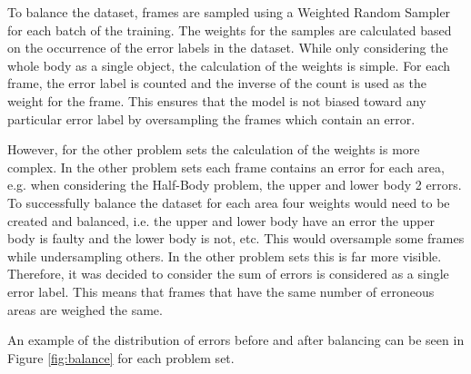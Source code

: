 To balance the dataset, frames are sampled using a Weighted Random Sampler for each batch of the training. The weights for the samples are calculated based on the occurrence of the error labels in the dataset. While only considering the whole body as a single object, the calculation of the weights is simple. For each frame, the error label is counted and the inverse of the count is used as the weight for the frame. This ensures that the model is not biased toward any particular error label by oversampling the frames which contain an error.

However, for the other problem sets the calculation of the weights is more complex. In the other problem sets each frame contains an error for each area, e.g. when considering the Half-Body problem, the upper and lower body 2 errors. To successfully balance the dataset for each area four weights would need to be created and balanced, i.e. the upper and lower body have an error the upper body is faulty and the lower body is not, etc. This would oversample some frames while undersampling others. In the other problem sets this is far more visible. Therefore, it was decided to consider the sum of errors is considered as a single error label. This means that frames that have the same number of erroneous areas are weighed the same.

An example of the distribution of errors before and after balancing can be seen in Figure \ref{fig:balance} for each problem set.
